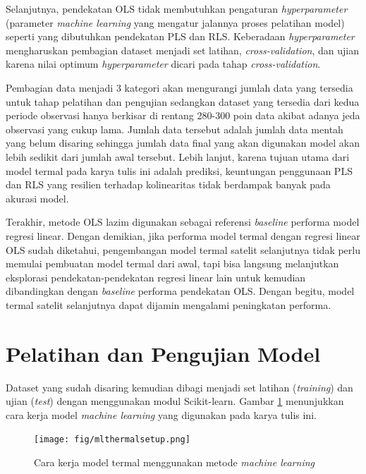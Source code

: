 Selanjutnya, pendekatan OLS tidak membutuhkan pengaturan \textit{hyperparameter}
(parameter \textit{machine learning} yang mengatur jalannya proses pelatihan
model) seperti yang dibutuhkan pendekatan PLS dan RLS. Keberadaan
\textit{hyperparameter} mengharuskan pembagian dataset menjadi set latihan,
\textit{cross-validation}, dan ujian karena nilai optimum \textit{hyperparameter}
dicari pada tahap \textit{cross-validation}.

Pembagian data menjadi 3 kategori akan mengurangi jumlah data yang tersedia
untuk tahap pelatihan dan pengujian sedangkan dataset yang tersedia dari kedua
periode observasi hanya berkisar di rentang 280-300 poin data akibat adanya
jeda observasi yang cukup lama. Jumlah data tersebut adalah jumlah data mentah
yang belum disaring sehingga jumlah data final yang akan digunakan model akan
lebih sedikit dari jumlah awal tersebut. Lebih lanjut, karena tujuan utama dari
model termal pada karya tulis ini adalah prediksi, keuntungan penggunaan PLS
dan RLS yang resilien terhadap kolinearitas tidak berdampak banyak pada akurasi
model.

Terakhir, metode OLS lazim digunakan sebagai referensi \textit{baseline}
performa model regresi linear. Dengan demikian, jika performa model termal
dengan regresi linear OLS sudah diketahui, pengembangan model termal satelit
selanjutnya tidak perlu memulai pembuatan model termal dari awal, tapi bisa
langsung melanjutkan eksplorasi pendekatan-pendekatan regresi linear lain untuk
kemudian dibandingkan dengan \textit{baseline} performa pendekatan OLS. Dengan
begitu, model termal satelit selanjutnya dapat dijamin mengalami peningkatan
performa.

\section{Pelatihan dan Pengujian Model}

Dataset yang sudah disaring kemudian dibagi menjadi set latihan
(\textit{training}) dan ujian (\textit{test}) dengan menggunakan modul
Scikit-learn. Gambar \ref{fig:mlthermalsetup} menunjukkan cara kerja model
\textit{machine learning} yang digunakan pada karya tulis ini.

\begin{figure}[H]
\setlength{}
\begin{center}
\texttt{[image: fig/mlthermalsetup.png]}
	\caption{Cara kerja model termal menggunakan metode \textit{machine learning}}
\label{fig:mlthermalsetup}
\end{center}
\end{figure}

